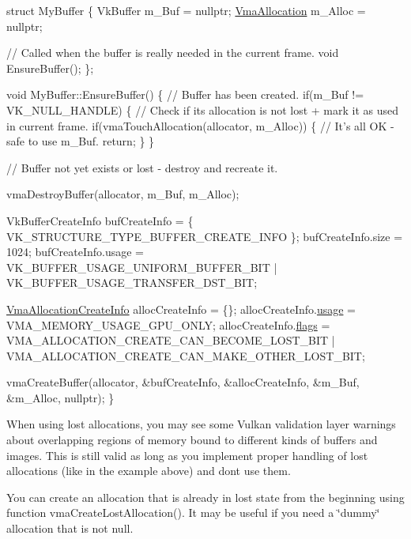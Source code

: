 \begin{DoxyCode}
\textcolor{keyword}{struct }MyBuffer
\{
    VkBuffer m\_Buf = \textcolor{keyword}{nullptr};
    \hyperlink{structVmaAllocation}{VmaAllocation} m\_Alloc = \textcolor{keyword}{nullptr};

    \textcolor{comment}{// Called when the buffer is really needed in the current frame.}
    \textcolor{keywordtype}{void} EnsureBuffer();
\};

\textcolor{keywordtype}{void} MyBuffer::EnsureBuffer()
\{
    \textcolor{comment}{// Buffer has been created.}
    \textcolor{keywordflow}{if}(m\_Buf != VK\_NULL\_HANDLE)
    \{
        \textcolor{comment}{// Check if its allocation is not lost + mark it as used in current frame.}
        \textcolor{keywordflow}{if}(vmaTouchAllocation(allocator, m\_Alloc))
        \{
            \textcolor{comment}{// It's all OK - safe to use m\_Buf.}
            \textcolor{keywordflow}{return};
        \}
    \}

    \textcolor{comment}{// Buffer not yet exists or lost - destroy and recreate it.}

    vmaDestroyBuffer(allocator, m\_Buf, m\_Alloc);

    VkBufferCreateInfo bufCreateInfo = \{ VK\_STRUCTURE\_TYPE\_BUFFER\_CREATE\_INFO \};
    bufCreateInfo.size = 1024;
    bufCreateInfo.usage = VK\_BUFFER\_USAGE\_UNIFORM\_BUFFER\_BIT | VK\_BUFFER\_USAGE\_TRANSFER\_DST\_BIT;

    \hyperlink{structVmaAllocationCreateInfo}{VmaAllocationCreateInfo} allocCreateInfo = \{\};
    allocCreateInfo.\hyperlink{structVmaAllocationCreateInfo_accb8b06b1f677d858cb9af20705fa910}{usage} = VMA\_MEMORY\_USAGE\_GPU\_ONLY;
    allocCreateInfo.\hyperlink{structVmaAllocationCreateInfo_add09658ac14fe290ace25470ddd6d41b}{flags} = VMA\_ALLOCATION\_CREATE\_CAN\_BECOME\_LOST\_BIT |
        VMA\_ALLOCATION\_CREATE\_CAN\_MAKE\_OTHER\_LOST\_BIT;

    vmaCreateBuffer(allocator, &bufCreateInfo, &allocCreateInfo, &m\_Buf, &m\_Alloc, \textcolor{keyword}{nullptr});
\}
\end{DoxyCode}


When using lost allocations, you may see some Vulkan validation layer warnings about overlapping regions of memory bound to different kinds of buffers and images. This is still valid as long as you implement proper handling of lost allocations (like in the example above) and don\textquotesingle{}t use them.

You can create an allocation that is already in lost state from the beginning using function vma\+Create\+Lost\+Allocation(). It may be useful if you need a \char`\"{}dummy\char`\"{} allocation that is not null.


